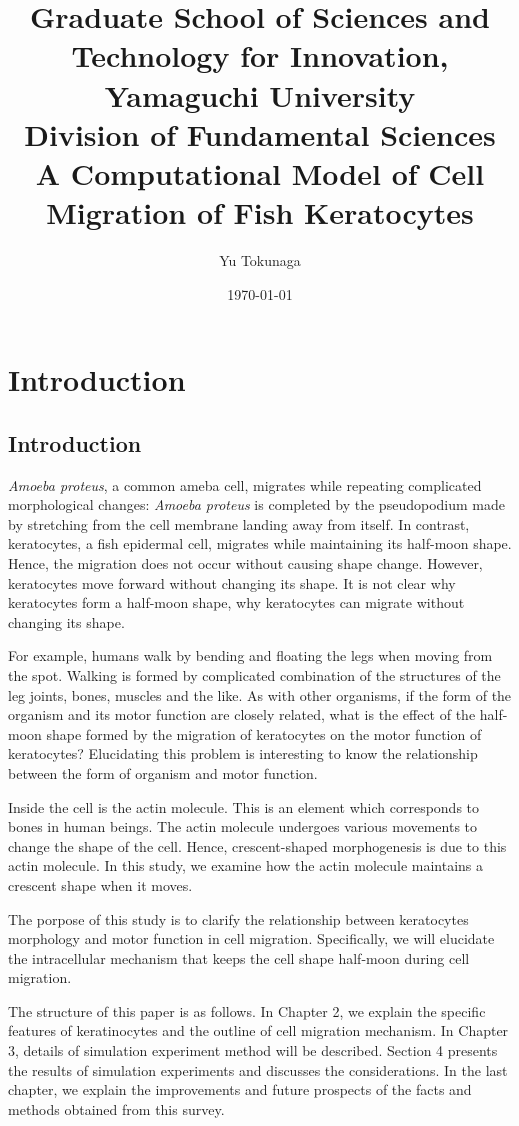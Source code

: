 \documentclass[a4paper,12pt]{book}
\title{\Large Graduate School of Sciences and Technology for Innovation, Yamaguchi University\\[1cm]
Division of Fundamental Sciences\\[3cm]
\huge A Computational Model of Cell Migration of Fish Keratocytes\\[5cm]
}
\author{Yu Tokunaga}
\date{\Large \today}
\begin{document}
\maketitle
\setcounter{page}{1}
\tableofcontents
\chapter{Introduction}
\setcounter{page}{1}
\section{Introduction}
{\it Amoeba proteus}, a common ameba cell, migrates while repeating complicated morphological changes:
{\it Amoeba proteus} is completed by the pseudopodium made by stretching from the cell membrane landing away from itself.
In contrast, keratocytes, a fish epidermal cell, migrates while maintaining its half-moon shape.
Hence, the migration does not occur without causing shape change.
However, keratocytes move forward without changing its shape. It is not clear why keratocytes form a half-moon shape, why keratocytes can migrate without changing its shape.

For example, humans walk by bending and floating the legs when moving from the spot. 
Walking is formed by complicated combination of the structures of the leg joints, bones, muscles and the like.
As with other organisms, if the form of the organism and its motor function are closely related, what is the effect of the half-moon shape formed by the migration of keratocytes on the motor function of keratocytes?
Elucidating this problem is interesting to know the relationship between the form of organism and motor function.

Inside the cell is the actin molecule. This is an element which corresponds to bones in human beings. The actin molecule undergoes various movements to change the shape of the cell.
Hence, crescent-shaped morphogenesis is due to this actin molecule.
In this study, we examine how the actin molecule maintains a crescent shape when it moves.

The porpose of this study is to clarify the relationship between keratocytes morphology and motor function in cell migration. Specifically, we will elucidate the intracellular mechanism that keeps the cell shape half-moon during cell migration.

The structure of this paper is as follows. In Chapter 2, we explain the specific features of keratinocytes and the outline of cell migration mechanism. In Chapter 3, details of simulation experiment method will be described. Section 4 presents the results of simulation experiments and discusses the considerations. In the last chapter, we explain the improvements and future prospects of the facts and methods obtained from this survey.
\end{document}
